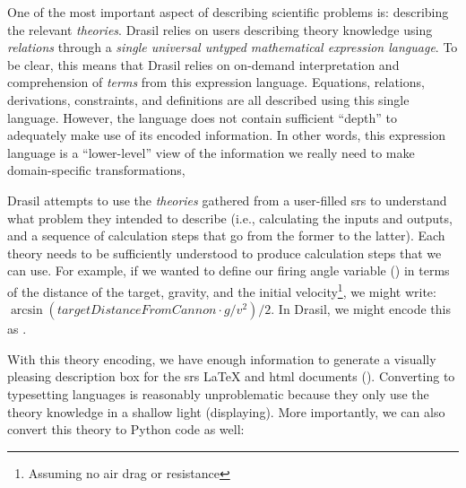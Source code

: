 One of the most important aspect of describing scientific problems is:
describing the relevant \textit{theories}. Drasil relies on users describing
theory knowledge using \textit{relations} through a \textit{single universal
      untyped mathematical expression language}. To be clear, this means that Drasil
relies on on-demand interpretation and comprehension of \textit{terms} from this
expression language. Equations, relations, derivations, constraints, and
definitions are all described using this single language. However, the language
does not contain sufficient ``depth'' to adequately make use of its encoded
information. In other words, this expression language is a ``lower-level'' view
of the information we really need to make domain-specific transformations,

Drasil attempts to use the \textit{theories} gathered from a user-filled
\acs{srs} to understand what problem they intended to describe (i.e.,
calculating the inputs and outputs, and a sequence of calculation steps that go
from the former to the latter). Each theory needs to be sufficiently understood
to produce calculation steps that we can use. For example, if we wanted to
define our firing angle variable () in terms
of the distance of the target, gravity, and the initial
velocity\footnote{Assuming no air drag or resistance}, we might write:
\(\arcsin{}(\mathit{targetDistanceFromCannon} \cdot{} g / v^2) / 2\). In Drasil,
we might encode this as .

\exampleAngleEquationEncoding{}

With this theory encoding, we have enough information to generate a visually
pleasing description box for the \acs{srs} \LaTeX{} and \acs{html} documents
(). Converting to typesetting languages
is reasonably unproblematic because they only use the theory knowledge in a
shallow light (displaying). More importantly, we can also convert this theory to
Python code as well:

\exampleAngleEquationEncodingToPython{}

